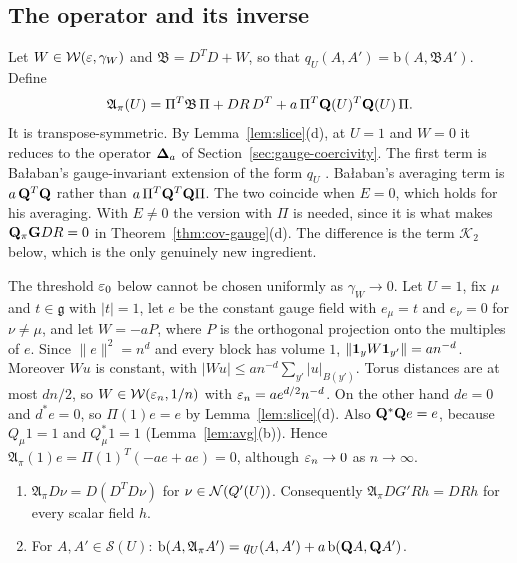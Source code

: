 \subsection{The operator and its inverse}

Let $W\in\mathcal W(\varepsilon,\gamma_W)$ and $\mathfrak B=D^TD+W$, so that $q_U(A,A')=\mathrm b(A,\mathfrak BA')$. Define
\[
\mathfrak A_\pi(U)=\Pi^T\mathfrak B\,\Pi+DR\,D^T+a\,\Pi^T\mathbf Q(U)^T\mathbf Q(U)\,\Pi .
\]
It is transpose-symmetric. By Lemma~\ref{lem:slice}(d), at $U=1$ and $W=0$ it reduces to the operator $\boldsymbol{\Delta}_a$ of Section~\ref{sec:gauge-coercivity}. The first term is Ba\l aban's gauge-invariant extension of the form $q_U$ \cite[(3.118)--(3.120), (3.128)]{BalBackground}. Ba\l aban's averaging term is $a\,\mathbf Q^T\mathbf Q$ rather than $a\,\Pi^T\mathbf Q^T\mathbf Q\Pi$. The two coincide when $E=0$, which holds for his averaging. With $E\ne0$ the version with $\Pi$ is needed, since it is what makes $\mathbf Q_\pi\mathbf G DR=0$ in Theorem~\ref{thm:cov-gauge}(d). The difference is the term $\mathcal K_2$ below, which is the only genuinely new ingredient.

\begin{remark}\label{rem:gammaW}
The threshold $\varepsilon_0$ below cannot be chosen uniformly as $\gamma_W\to0$. Let $U=1$, fix $\mu$ and $t\in\mathfrak g$ with $|t|=1$, let $e$ be the constant gauge field with $e_\mu=t$ and $e_\nu=0$ for $\nu\ne\mu$, and let $W=-aP$, where $P$ is the orthogonal projection onto the multiples of $e$. Since $\|e\|^2=n^d$ and every block has volume $1$, $\|\mathbf 1_yW\mathbf 1_{y'}\|=an^{-d}$. Moreover $Wu$ is constant, with $|Wu|\le an^{-d}\sum_{y'}|u|_{B(y')}$. Torus distances are at most $dn/2$, so $W\in\mathcal W(\varepsilon_n,1/n)$ with $\varepsilon_n=ae^{d/2}n^{-d}$. On the other hand $de=0$ and $d^*e=0$, so $\Pi(1)e=e$ by Lemma~\ref{lem:slice}(d). Also $\mathbf Q^*\mathbf Q e=e$, because $Q_\mu1=1$ and $Q_\mu^*1=1$ (Lemma~\ref{lem:avg}(b)). Hence $\mathfrak A_\pi(1)e=\Pi(1)^T(-ae+ae)=0$, although $\varepsilon_n\to0$ as $n\to\infty$.
\end{remark}

\begin{lemma}[Identities]\label{lem:Api-identities}
\begin{enumerate}[label=(\alph*)]
\item $\mathfrak A_\pi D\nu=D(D^TD\nu)$ for $\nu\in\mathcal N(Q'(U))$. Consequently $\mathfrak A_\pi DG'Rh=DRh$ for every scalar field $h$.
\item For $A,A'\in\mathcal S(U)$: $\mathrm b(A,\mathfrak A_\pi A')=q_U(A,A')+a\,\mathrm b(\mathbf Q A,\mathbf Q A')$.
\end{enumerate}
\end{lemma}

